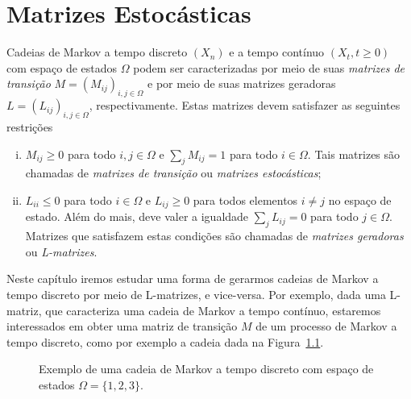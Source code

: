 \documentclass[twoside,openright,titlepage,numbers=noenddot,headinclude,  lineheaders footinclude=true,cleardoublepage=empty,
                                BCOR=5mm,paper=a4,fontsize=12pt ]{scrbook}
\theoremstyle{definition}
\begin{document}
\chapter{Matrizes Estoc\'asticas}

Cadeias de Markov a tempo discreto $(X_n)$  e a tempo contínuo
$(X_t, t \geq 0)$ com espaço de estados $\Omega$ podem ser caracterizadas por meio de suas
\textit{matrizes de transição} $M= (M_{ij})_{i,j \in \Omega}$ e por meio de suas matrizes geradoras
 $L = (L_{ij})_{i,j \in \Omega}$,
respectivamente. Estas matrizes devem satisfazer as seguintes restrições 
\begin{enumerate}[(i)]
    \item $M_{ij} \geq 0$ para todo $i, j \in \Omega$ e $\sum_j M_{ij} = 1$ para todo $i \in \Omega$.
    Tais matrizes são chamadas de \textit{matrizes de transição} ou \textit{matrizes estocásticas};
    \item $L_{ii} \leq 0$ para todo $i \in \Omega$ e $L_{ij} \geq 0$ para todos elementos $i \neq j$ no espaço
    de estado. Além do mais, deve valer a igualdade
    $\sum_j L_{ij} = 0$ para todo $j \in \Omega$. Matrizes que satisfazem estas condições são chamadas 
    de \textit{matrizes geradoras} ou \textit{L-matrizes}.
\end{enumerate}

Neste capítulo iremos estudar uma forma
de gerarmos cadeias de Markov a tempo discreto por meio de L-matrizes, e vice-versa. Por exemplo, dada uma L-matriz, que caracteriza uma 
cadeia de Markov a tempo contínuo, estaremos interessados em obter uma matriz de transição $M$ de um 
processo de Markov a tempo discreto, como por exemplo a cadeia dada na Figura~\ref{fig:Markov}.
\begin{figure}[h]
\centering
{}
\caption{Exemplo de uma cadeia de Markov a tempo discreto com espaço de estados $\Omega = \{1, 2, 3\}$.}
\label{fig:Markov}
\end{figure}
\end{document}
